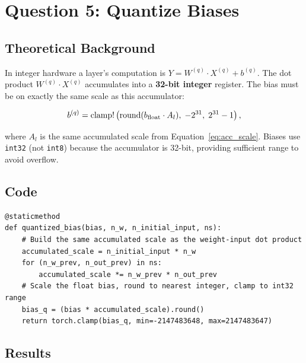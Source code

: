 \documentclass[11pt, letterpaper]{article}
\begin{document}
\section{Question 5: Quantize Biases}

\subsection{Theoretical Background}

In integer hardware a layer's computation is
$Y = W^{(q)} \cdot X^{(q)} + b^{(q)}.$
The dot product $W^{(q)}\cdot X^{(q)}$ accumulates into a \textbf{32-bit integer}
register. The bias must be on exactly the same scale as this accumulator:

\begin{equation}
  b^{(q)} = \mathrm{clamp}\\!\left(
    \mathrm{round}(b_{\mathrm{float}} \cdot A_l),\;
    -2^{31},\; 2^{31}-1
  \right),
  \label{eq:bias_quant}
\end{equation}

where $A_l$ is the same accumulated scale from Equation~\eqref{eq:acc_scale}.
Biases use \texttt{int32} (not \texttt{int8}) because the accumulator is 32-bit,
providing sufficient range to avoid overflow.

\subsection{Code}

\begin{lstlisting}[caption={Bias quantization to int32 --- \texttt{quantized\_bias}.}]
@staticmethod
def quantized_bias(bias, n_w, n_initial_input, ns):
    # Build the same accumulated scale as the weight-input dot product
    accumulated_scale = n_initial_input * n_w
    for (n_w_prev, n_out_prev) in ns:
        accumulated_scale *= n_w_prev * n_out_prev
    # Scale the float bias, round to nearest integer, clamp to int32 range
    bias_q = (bias * accumulated_scale).round()
    return torch.clamp(bias_q, min=-2147483648, max=2147483647)
\end{lstlisting}

\subsection{Results}
\end{document}

